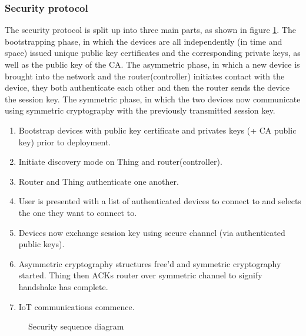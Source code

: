\documentclass{mprop}
\begin{document}
\subsubsection{Security protocol} %
\label{ssub:security_protocol}
The security protocol is split up into three main parts, as shown in figure \ref{fig:sequence_diagram}. The bootstrapping phase, in which the devices are all independently (in time and space) issued unique public key certificates and the corresponding private keys, as well as the public key of the CA. The asymmetric phase, in which a new device is brought into the network and the router(controller) initiates contact with the device, they both authenticate each other and then the router sends the device the session key. The symmetric phase, in which the two devices now communicate using symmetric cryptography with the previously transmitted session key.
\begin{enumerate}
  \item Bootstrap devices with public key certificate and privates keys (+ CA public key) prior to deployment.
  \item Initiate discovery mode on Thing and router(controller).
  \item Router and Thing authenticate one another.
  \item User is presented with a list of authenticated devices to connect to and selects the one they want to connect to.
  \item Devices now exchange session key using secure channel (via authenticated public keys).
  \item Asymmetric cryptography structures free'd and symmetric cryptography started. Thing then ACKs router over symmetric channel to signify handshake has complete.
  \item IoT communications commence.
\end{enumerate}


\begin{figure}[h!]
\begin{center}

\caption{Security sequence diagram}
\label{fig:sequence_diagram}
\end{center}
\end{figure}

\end{document}
